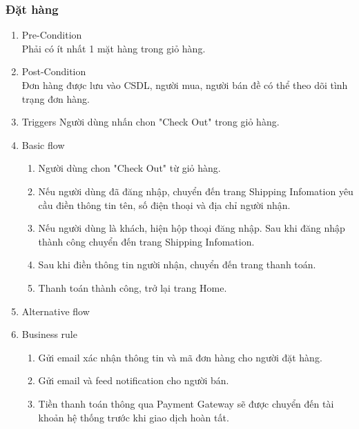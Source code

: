 \subsubsection{Đặt hàng}
\begin{enumerate}
	\item Pre-Condition\\
	Phải có ít nhất 1 mặt hàng trong giỏ hàng.
	\item Post-Condition\\
	Đơn hàng được lưu vào CSDL, người mua, người bán đề có thể theo dõi tình trạng đơn hàng.
	\item Triggers
	Người dùng nhấn chon "Check Out" trong giỏ hàng.
	\item Basic flow
	\begin{enumerate}
		\item Người dùng chon "Check Out" từ giỏ hàng.
		\item Nếu người dùng đã đăng nhập, chuyển đến trang Shipping Infomation yêu cầu điền thông tin tên, số điện thoại và địa chỉ người nhận.
		\item Nếu người dùng là khách, hiện hộp thoại đăng nhập. Sau khi đăng nhập thành công chuyển đến trang Shipping Infomation.
		\item Sau khi điền thông tin người nhận, chuyển đến trang thanh toán. 
		\item Thanh toán thành công, trở lại trang Home.
	\end{enumerate}
	\item Alternative flow
	\item Business rule
	\begin{enumerate}
		\item Gửi email xác nhận thông tin và mã đơn hàng cho người đặt hàng.
		\item Gửi email và feed notification cho người bán.
		\item Tiền thanh toán thông qua Payment Gateway sẽ được chuyển đến tài khoản hệ thống trước khi giao dịch hoàn tất.
	\end{enumerate}
\end{enumerate}

